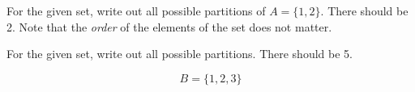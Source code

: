 \documentclass[a4paper,12pt]{book}
\newcounter{question}
\begin{document}
        \begin{questionNOGRADE}{\thequestion}

            For the given set, write out all possible partitions of
            $ A = \{1, 2\} $.
            There should be 2. Note that the \textit{order} of the
            elements of the set does not matter.


        \end{questionNOGRADE}

        \notonkey{ \newpage }{ \hrulefill }

        \begin{questionNOGRADE}{\thequestion}

            For the given set, write out all possible partitions.
            There should be 5.

            $$ B = \{1, 2, 3\} $$


        \end{questionNOGRADE}

        \hrulefill
\end{document}
